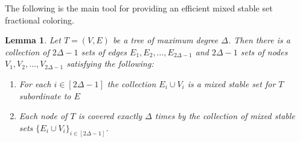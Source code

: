 \documentclass[smallextended]{svjour3}
\newtheorem{lemma}[proposition]{Lemma}
\begin{document}
{}

	The following is the main tool for providing an efficient mixed stable set fractional coloring. 

	\begin{lemma}\label{lemma:treeMSS}
		Let $T = (V, E)$ be a tree of maximum degree $\Delta$. Then there is a collection of $2\Delta-1$ sets of edges $E_1, E_2, \ldots, E_{2\Delta-1}$ and $2\Delta-1$ sets of nodes $V_1, V_2, \ldots, V_{2\Delta -1}$ satisfying the following:
		\begin{enumerate}
			\item For each $i \in [2\Delta -1]$ the collection $E_i \cup V_i$ is a mixed stable set for $T$ subordinate to $E$
			
			
			
			\item Each node of $T$ is covered exactly $\Delta$ times by the collection of mixed stable sets $\{E_i \cup V_i\}_{i \in [2\Delta - 1]}$.
		\end{enumerate}
	\end{lemma}
	
\end{document}
